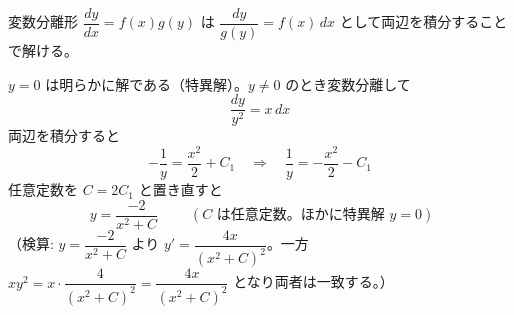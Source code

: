 
変数分離形 $\dfrac{dy}{dx} = f(x)g(y)$ は $\dfrac{dy}{g(y)} = f(x)\,dx$ として両辺を積分することで解ける。

$y = 0$ は明らかに解である（特異解）。$y \neq 0$ のとき変数分離して
\[
\frac{dy}{y^{2}} = x\,dx
\]
両辺を積分すると
\[
-\frac{1}{y} = \frac{x^{2}}{2} + C_{1}
\quad\Longrightarrow\quad
\frac{1}{y} = -\frac{x^{2}}{2} - C_{1}
\]
任意定数を $C = 2C_{1}$ と置き直すと
\[
\boxed{\; y = \frac{-2}{x^{2}+C} \;}
\qquad (C \text{ は任意定数。ほかに特異解 } y=0)
\]
（検算: $y=\dfrac{-2}{x^{2}+C}$ より $y' = \dfrac{4x}{(x^{2}+C)^{2}}$。一方 $xy^{2} = x\cdot\dfrac{4}{(x^{2}+C)^{2}} = \dfrac{4x}{(x^{2}+C)^{2}}$ となり両者は一致する。）
